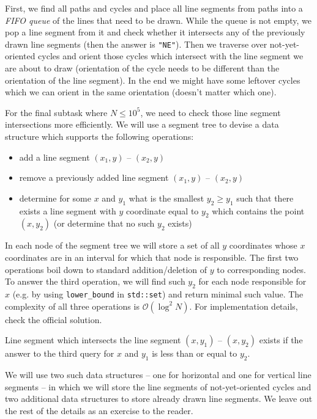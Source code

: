 \documentclass[a4paper]{article}
\begin{document}
First, we find all paths and cycles and place all line segments from paths into
a \textit{FIFO queue} of the lines that need to be drawn. While the queue is not
empty, we pop a line segment from it and check whether it intersects any of the
previously drawn line segments (then the answer is \texttt{"NE"}). Then we
traverse over not-yet-oriented cycles and orient those cycles which intersect
with the line segment we are about to draw (orientation of the cycle needs to
be different than the orientation of the line segment). In the end we might have
some leftover cycles which we can orient in the same orientation (doesn't matter
which one).

For the final subtask where $N \le 10^5$, we need to check those line segment
intersections more efficiently. We will use a segment tree to devise a data
structure which supports the following operations:

\begin{itemize}
  \item add a line segment $(x_1, y)$ -- $(x_2, y)$
  \item remove a previously added line segment $(x_1, y)$ -- $(x_2, y)$
  \item determine for some $x$ and $y_1$ what is the smallest $y_2 \ge y_1$ such that
    there exists a line segment with $y$ coordinate equal to $y_2$ which contains
    the point $(x, y_2)$ (or determine that no such $y_2$ exists)
\end{itemize}

In each node of the segment tree we will store a set of all $y$ coordinates
whose $x$ coordinates are in an interval for which that node is responsible.
The first two operations boil down to standard addition/deletion of $y$ to
corresponding nodes. To answer the third operation, we will find such $y_2$ for
each node responsible for $x$ (e.g. by using \texttt{lower\_bound} in \texttt{std::set}) and
return minimal such value. The complexity of all three operations is
$\mathcal{O}(\log^2 N)$. For implementation details, check the official solution.

Line segment which intersects the line segment $(x, y_1)$ -- $(x, y_2)$ exists if
the answer to the third query for $x$ and $y_1$ is less than or equal to $y_2$.

We will use two such data structures -- one for horizontal and one for vertical
line segments -- in which we will store the line segments of not-yet-oriented
cycles and two additional data structures to store already drawn line segments.
We leave out the rest of the details as an exercise to the reader.
\end{document}
